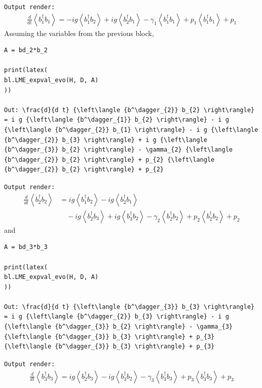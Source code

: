 \documentclass[onecolumn, 12pt, sort&compress]{elsarticle}
\newcommand{\inlinecode}[1]{\texttt{#1}}
\newenvironment{revision2}{%
\color{red}
}
{}
\begin{document}
\begin{revision2}
\inlinecode{Output render:}
\begin{align*}
\frac{d}{d t} {\left\langle {b^\dagger_{1}} b_{1} \right\rangle} = - i g {\left\langle {b^\dagger_{1}} b_{2} \right\rangle} + i g {\left\langle {b^\dagger_{2}} b_{1} \right\rangle} - \gamma_{1} {\left\langle {b^\dagger_{1}} b_{1} \right\rangle} + p_{1} {\left\langle {b^\dagger_{1}} b_{1} \right\rangle} + p_{1}
\end{align*}
\end{revision2}
Assuming the variables from the previous block,
\begin{verbatim}
A = bd_2*b_2

print(latex(
bl.LME_expval_evo(H, D, A)
))

Out: \frac{d}{d t} {\left\langle {b^\dagger_{2}} b_{2} \right\rangle} = i g {\left\langle {b^\dagger_{1}} b_{2} \right\rangle} - i g {\left\langle {b^\dagger_{2}} b_{1} \right\rangle} - i g {\left\langle {b^\dagger_{2}} b_{3} \right\rangle} + i g {\left\langle {b^\dagger_{3}} b_{2} \right\rangle} - \gamma_{2} {\left\langle {b^\dagger_{2}} b_{2} \right\rangle} + p_{2} {\left\langle {b^\dagger_{2}} b_{2} \right\rangle} + p_{2}
\end{verbatim}
\begin{revision2}
\inlinecode{Output render:}
\begin{align*}
\frac{d}{d t} {\left\langle {b^\dagger_{2}} b_{2} \right\rangle} &= i g {\left\langle {b^\dagger_{1}} b_{2} \right\rangle} - i g {\left\langle {b^\dagger_{2}} b_{1} \right\rangle} 
\\
&\quad - i g {\left\langle {b^\dagger_{2}} b_{3} \right\rangle} + i g {\left\langle {b^\dagger_{3}} b_{2} \right\rangle} - \gamma_{2} {\left\langle {b^\dagger_{2}} b_{2} \right\rangle} + p_{2} {\left\langle {b^\dagger_{2}} b_{2} \right\rangle} + p_{2}
\end{align*}
\end{revision2}
and
\begin{verbatim}
A = bd_3*b_3

print(latex(
bl.LME_expval_evo(H, D, A)
))

Out: \frac{d}{d t} {\left\langle {b^\dagger_{3}} b_{3} \right\rangle} = i g {\left\langle {b^\dagger_{2}} b_{3} \right\rangle} - i g {\left\langle {b^\dagger_{3}} b_{2} \right\rangle} - \gamma_{3} {\left\langle {b^\dagger_{3}} b_{3} \right\rangle} + p_{3} {\left\langle {b^\dagger_{3}} b_{3} \right\rangle} + p_{3}
\end{verbatim}
\begin{revision2}
\inlinecode{Output render:}
\begin{align*}
\frac{d}{d t} {\left\langle {b^\dagger_{3}} b_{3} \right\rangle} = i g {\left\langle {b^\dagger_{2}} b_{3} \right\rangle} - i g {\left\langle {b^\dagger_{3}} b_{2} \right\rangle} - \gamma_{3} {\left\langle {b^\dagger_{3}} b_{3} \right\rangle} + p_{3} {\left\langle {b^\dagger_{3}} b_{3} \right\rangle} + p_{3}
\end{align*}
\end{revision2}
\end{document}
